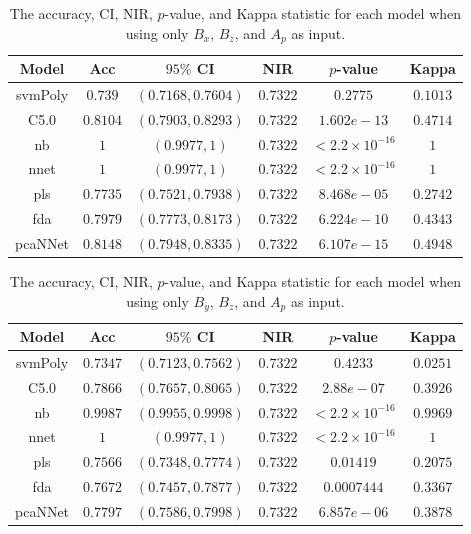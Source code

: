 \documentclass[sn-mathphys-num]{sn-jnl}%
\begin{document}
\begin{table}[!ht]
    \centering
    \caption{The accuracy, CI, NIR, $p$-value, and Kappa statistic for each model when using only $B_{x}$, $B_{z}$, and $A_{p}$ as input.}
	\label{tab:stats:reverse:xzap}
	\begin{tabular}{|c|c|c|c|c|c|}
		\hline
		Model & Acc & $95\%$ CI & NIR & $p$-value & Kappa \\ \hline
		svmPoly & $0.739$ & $(0.7168, 0.7604)$ & $0.7322$ & $0.2775$ & $0.1013$ \\ \hline
		C5.0 & $0.8104$ & $(0.7903, 0.8293)$ & $0.7322$ & $1.602e-13$ & $0.4714$ \\ \hline
		nb & $1$ & $(0.9977, 1)$ & $0.7322$ & $< 2.2 \times {10}^{-16}$ & $1$ \\ \hline
		nnet & $1$ & $(0.9977, 1)$ & $0.7322$ & $< 2.2 \times {10}^{-16}$ & $1$ \\ \hline
		pls & $0.7735$ & $(0.7521, 0.7938)$ & $0.7322$ & $8.468e-05$ & $0.2742$ \\ \hline
		fda & $0.7979$ & $(0.7773, 0.8173)$ & $0.7322$ & $6.224e-10$ & $0.4343$ \\ \hline
		pcaNNet & $0.8148$ & $(0.7948, 0.8335)$ & $0.7322$ & $6.107e-15$ & $0.4948$ \\ \hline
	\end{tabular}
\end{table}

\begin{table}[!ht]
    \centering
    \caption{The accuracy, CI, NIR, $p$-value, and Kappa statistic for each model when using only $B_{y}$, $B_{z}$, and $A_{p}$ as input.}
	\label{tab:stats:reverse:yzap}
	\begin{tabular}{|c|c|c|c|c|c|}
		\hline
		Model & Acc & $95\%$ CI & NIR & $p$-value & Kappa \\ \hline
		svmPoly & $0.7347$ & $(0.7123, 0.7562)$ & $0.7322$ & $0.4233$ & $0.0251$ \\ \hline
		C5.0 & $0.7866$ & $(0.7657, 0.8065)$ & $0.7322$ & $2.88e-07$ & $0.3926$ \\ \hline
		nb & $0.9987$ & $(0.9955, 0.9998)$ & $0.7322$ & $< 2.2 \times {10}^{-16}$ & $0.9969$ \\ \hline
		nnet & $1$ & $(0.9977, 1)$ & $0.7322$ & $< 2.2 \times {10}^{-16}$ & $1$ \\ \hline
		pls & $0.7566$ & $(0.7348, 0.7774)$ & $0.7322$ & $0.01419$ & $0.2075$ \\ \hline
		fda & $0.7672$ & $(0.7457, 0.7877)$ & $0.7322$ & $0.0007444$ & $0.3367$ \\ \hline
		pcaNNet & $0.7797$ & $(0.7586, 0.7998)$ & $0.7322$ & $6.857e-06$ & $0.3878$ \\ \hline
	\end{tabular}
\end{table}
\end{document}

